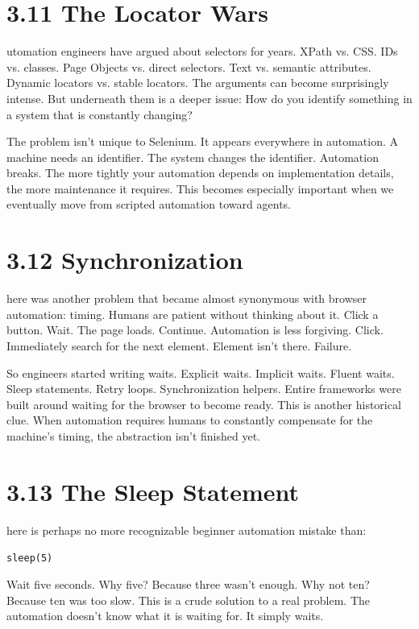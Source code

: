 \documentclass[11pt, a4paper, openany]{book}
\newcommand{\initialcap}[1]{{\fontfamily{lmss}\selectfont\huge\textbf{#1}}}
\begin{document}
\section{3.11 The Locator Wars}
\noindent \initialcap{A}utomation engineers have argued about selectors for years. XPath vs. CSS. IDs vs. classes. Page Objects vs. direct selectors. Text vs. semantic attributes. Dynamic locators vs. stable locators. The arguments can become surprisingly intense. But underneath them is a deeper issue: How do you identify something in a system that is constantly changing?

The problem isn't unique to Selenium. It appears everywhere in automation. A machine needs an identifier. The system changes the identifier. Automation breaks. The more tightly your automation depends on implementation details, the more maintenance it requires. This becomes especially important when we eventually move from scripted automation toward agents.

\section{3.12 Synchronization}
\noindent \initialcap{T}here was another problem that became almost synonymous with browser automation: timing. Humans are patient without thinking about it. Click a button. Wait. The page loads. Continue. Automation is less forgiving. Click. Immediately search for the next element. Element isn't there. Failure.

So engineers started writing waits. Explicit waits. Implicit waits. Fluent waits. Sleep statements. Retry loops. Synchronization helpers. Entire frameworks were built around waiting for the browser to become ready. This is another historical clue. When automation requires humans to constantly compensate for the machine's timing, the abstraction isn't finished yet.

\section{3.13 The Sleep Statement}
\noindent \initialcap{T}here is perhaps no more recognizable beginner automation mistake than:
\begin{center}
\texttt{sleep(5)}
\end{center}
Wait five seconds. Why five? Because three wasn't enough. Why not ten? Because ten was too slow. This is a crude solution to a real problem. The automation doesn't know what it is waiting for. It simply waits.
\end{document}
